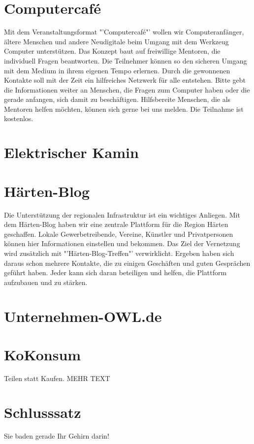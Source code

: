 \section{Computercafé}
Mit dem Veranstaltungsformat "'Computercafé"' wollen wir Computeranfänger, ältere Menschen und andere Neudigitale beim Umgang mit dem Werkzeug Computer unterstützen. Das Konzept baut auf freiwillige Mentoren, die individuell Fragen beantworten. Die Teilnehmer können so den sicheren Umgang mit dem Medium in ihrem eigenen Tempo erlernen. Durch die gewonnenen Kontakte soll mit der Zeit ein hilfreiches Netzwerk für alle entstehen. Bitte gebt die Informationen weiter an Menschen, die Fragen zum Computer haben oder die gerade anfangen, sich damit zu beschäftigen. Hilfsbereite Menschen, die als Mentoren helfen möchten, können sich gerne bei uns melden. Die Teilnahme ist kostenlos.
\section{Elektrischer Kamin}

\section{Härten-Blog}
Die Unterstützung der regionalen Infrastruktur ist ein wichtiges Anliegen.
%
Mit dem Härten-Blog haben wir eine zentrale Plattform für die Region Härten geschaffen.
%
Lokale Gewerbetreibende, Vereine, Künstler und Privatpersonen können hier Informationen einstellen und bekommen.
%
Das Ziel der Vernetzung wird zusätzlich mit "'Härten-Blog-Treffen"' verwirklicht.
%
Ergeben haben sich daraus schon mehrere Kontakte, die zu einigen Geschäften und guten Gesprächen geführt haben.
%
Jeder kann sich daran beteiligen und helfen, die Plattform aufzubauen und zu stärken.
\section{Unternehmen-OWL.de}
\section{KoKonsum}
Teilen statt Kaufen.
MEHR TEXT

\section{Schlusssatz}
Sie baden gerade Ihr Gehirn darin!